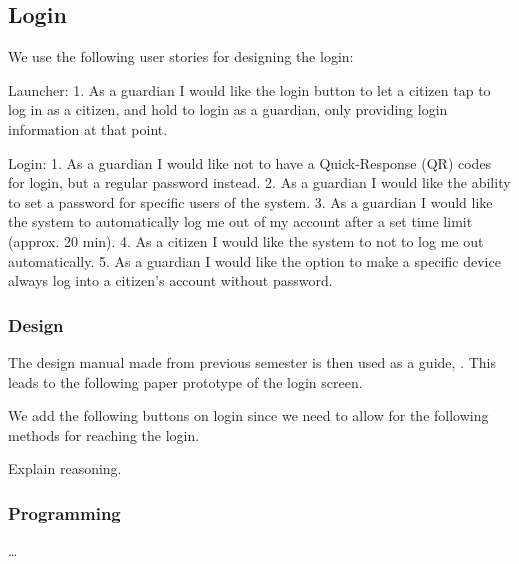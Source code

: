 \subsection{Login}

We use the following user stories for designing the login:

Launcher:
1. As a guardian I would like the login button to let a citizen tap to log in as
a citizen, and hold to login as a guardian, only providing login information at that point.

Login:
1. As a guardian I would like not to have a Quick-Response (QR) codes for login,
but a regular password instead.
2. As a guardian I would like the ability to set a password for specific users
of the system.
3. As a guardian I would like the system to automatically log me out of my
account after a set time limit (approx. 20 min).
4. As a citizen I would like the system to not to log me out automatically.
5. As a guardian I would like the option to make a specific device always log
into a citizen's account without password.

\subsubsection{Design}

The design manual made from previous semester is then used as a guide,
. This leads to the following paper
prototype of the login screen.


We add the following buttons on login since we need to allow for the
following methods for reaching the login.


Explain reasoning.

\subsubsection{Programming}

\ldots

